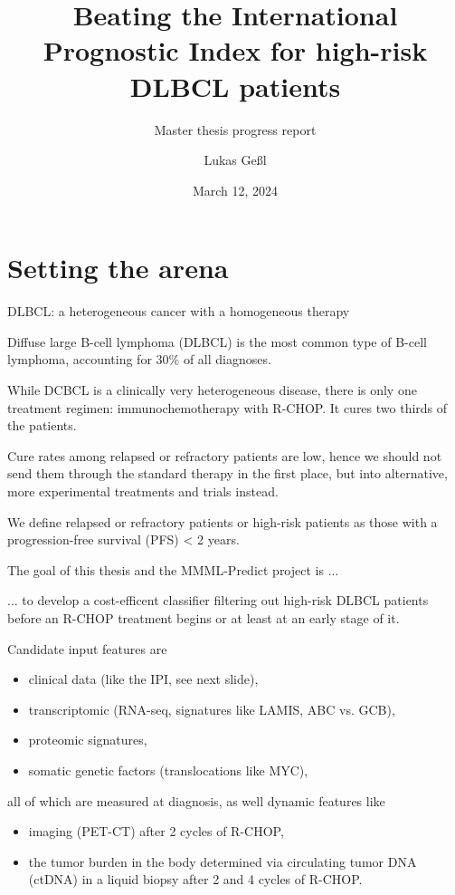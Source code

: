 \documentclass[10pt, aspectratio=169]{beamer}
\title{Beating the International Prognostic Index for high-risk DLBCL patients}
\subtitle{Master thesis progress report}
\date{March 12, 2024}
\author{Lukas Geßl}
\institute{Chair of Statistical Bioinformatics, Regensburg University}
\begin{document}
\maketitle


\section{Setting the arena}

\begin{frame}{DLBCL: a heterogeneous cancer with a homogeneous therapy}

  Diffuse large B-cell lymphoma (DLBCL) is the most common type of B-cell lymphoma, 
  accounting for 30\% of all diagnoses.

  While DCBCL is a clinically very heterogeneous disease, there is only one treatment 
  regimen: immunochemotherapy with R-CHOP. It cures two thirds of the patients.

  Cure rates among relapsed or refractory patients are low, hence we should not send 
  them through the standard therapy in the first place, but into alternative, more 
  experimental treatments and trials instead. 
  
  We define relapsed or refractory patients or \alert{high-risk} patients as those with a 
  \alert{progression-free survival (PFS) < 2 years}.

\end{frame}

\begin{frame}{The goal of this thesis and the MMML-Predict project is ...}

  ... to develop a \alert{cost-efficent classifier filtering out high-risk DLBCL patients} before an R-CHOP 
  treatment begins or at least at an early stage of it. 

  Candidate input features are 

  \begin{itemize}
    \item clinical data (like the IPI, see next slide),
    \item transcriptomic (RNA-seq, signatures like LAMIS, ABC vs. GCB),
    \item proteomic signatures,
    \item somatic genetic factors (translocations like MYC),
  \end{itemize}

  all of which are measured \alert{at diagnosis}, as well \alert{dynamic} features like 

  \begin{itemize}
    \item imaging (PET-CT) after 2 cycles of R-CHOP,
    \item the tumor burden in the body determined via circulating tumor DNA (ctDNA) in a 
    liquid biopsy after 2 and 4 cycles of R-CHOP. 
  \end{itemize}

\end{frame}
\end{document}

